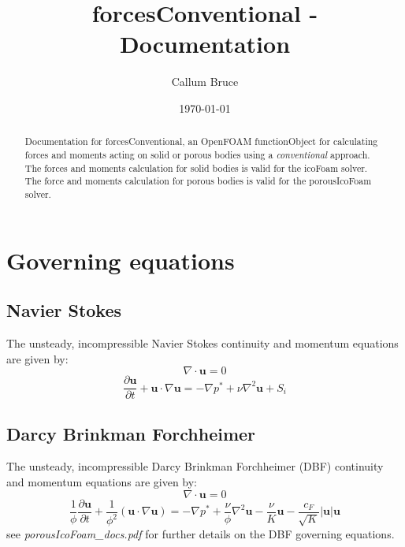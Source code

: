 \documentclass[a4paper,11pt]{report}
\begin{document}
\title{forcesConventional - Documentation}
\author{Callum Bruce}
\date{\today}
\maketitle

\begin{abstract}
Documentation for forcesConventional, an OpenFOAM functionObject for calculating forces and moments acting on solid or porous bodies using a \emph{conventional} approach. The forces and moments calculation for solid bodies is valid for the icoFoam solver. The force and moments calculation for porous bodies is valid for the porousIcoFoam solver.
\end{abstract}

\chapter{Governing equations}

\section{Navier Stokes}
\label{sec:ns_governing_equaitons}

The unsteady, incompressible Navier Stokes continuity and momentum equations are given by:
\begin{equation}
    \nabla\cdot\mathbf{u} = 0
    \label{eq:continuity}
\end{equation}
\begin{equation}
    \frac{\partial\mathbf{u}}{\partial{t}} + \mathbf{u}\cdot\nabla\mathbf{u} = -\nabla{p^*} + \nu\nabla^{2}\mathbf{u} + S_i
    \label{eq:ns_momentum}
\end{equation}

\section{Darcy Brinkman Forchheimer}
\label{sec:dbf_governing_equaitons}

The unsteady, incompressible Darcy Brinkman Forchheimer (DBF) continuity and momentum equations are given by:
\begin{equation}
    \nabla\cdot\mathbf{u} = 0
    \label{eq:dbf_continuity}
\end{equation}
\begin{equation}
    \frac{1}{\phi}\frac{\partial\mathbf{u}}{\partial{t}} + \frac{1}{\phi^{2}}(\mathbf{u}\cdot\nabla\mathbf{u}) = -\nabla{p^*} + \frac{\nu}{\phi}\nabla^{2}\mathbf{u} - \frac{\nu}{K}\mathbf{u} - \frac{c_{F}}{\sqrt{K}}\lvert\mathbf{u}\rvert\mathbf{u}
\label{eq:dbf_momentum}
\end{equation}
see \emph{porousIcoFoam\_docs.pdf} for further details on the DBF governing equations.
\end{document}
